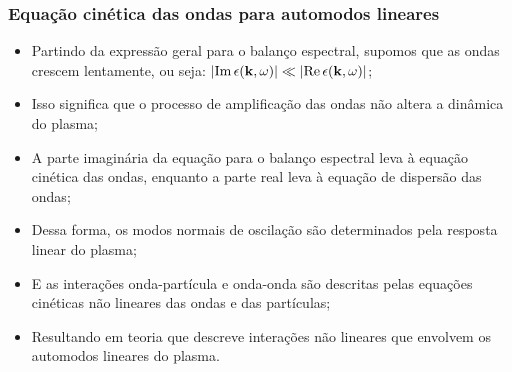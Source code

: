\documentclass[10pt,aspectratio=1610,lualatex]{beamer}
\begin{document}
\begin{frame}
  \frametitle{Equação cinética das ondas para automodos lineares}
  \begin{itemize}
  \item Partindo da expressão geral para o balanço espectral,
    supomos que as ondas crescem lentamente, ou seja:
    $|\mbox{Im}\, \epsilon({\bf k},\omega)|\ll|\mbox{Re}\,
    \epsilon({\bf k},\omega)|$;
  \item Isso significa que o processo de amplificação das ondas
    não altera a dinâmica do plasma;
  \item A parte imaginária da equação para o balanço espectral leva à
    equação cinética das ondas, enquanto a parte real leva à equação de
    dispersão das ondas;
  \item Dessa forma, os modos normais de oscilação são determinados pela
    resposta linear do plasma;
  \item E as interações onda-partícula e onda-onda são descritas
    pelas equações cinéticas não lineares das ondas e das partículas;
    \item Resultando em teoria que descreve \alert{interações
    não lineares que envolvem os automodos lineares do plasma}. 
  \end{itemize}
\end{frame}
\end{document}
